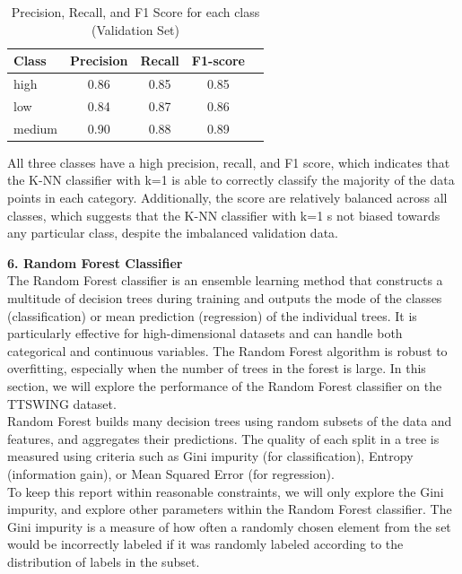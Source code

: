\documentclass[12pt]{article}
\begin{document}
\begin{table}[H]
\centering
\caption{Precision, Recall, and F1 Score for each class (Validation Set)}
\label{tab:knn_prf1}
\begin{tabular}{lcccc}
\toprule
Class      & Precision & Recall & F1-score \\
\midrule
high       & 0.86      & 0.85   & 0.85     \\
low        & 0.84      & 0.87   & 0.86     \\
medium     & 0.90      & 0.88   & 0.89     \\
\bottomrule
\end{tabular}
\end{table}

All three classes have a high precision, recall, and F1 score, which indicates that the K-NN classifier with k=1 is able to correctly classify the majority of the data points in each category. Additionally, the score are relatively balanced across all classes, which suggests that the K-NN classifier with k=1 s not biased towards any particular class, despite the imbalanced validation data.
\\

\vspace{20pt}

\textbf{6. Random Forest Classifier}
\\
The Random Forest classifier is an ensemble learning method that constructs a multitude of decision trees during training and outputs the mode of the classes (classification) or mean prediction (regression) of the individual trees. It is particularly effective for high-dimensional datasets and can handle both categorical and continuous variables. The Random Forest algorithm is robust to overfitting, especially when the number of trees in the forest is large. In this section, we will explore the performance of the Random Forest classifier on the TTSWING dataset.
\\
Random Forest builds many decision trees using random subsets of the data and features, and aggregates their predictions. The quality of each split in a tree is measured using criteria such as Gini impurity (for classification), Entropy (information gain), or Mean Squared Error (for regression). 
\\
To keep this report within reasonable constraints, we will only explore the Gini impurity, and explore other parameters within the Random Forest classifier. The Gini impurity is a measure of how often a randomly chosen element from the set would be incorrectly labeled if it was randomly labeled according to the distribution of labels in the subset. 
\end{document}
